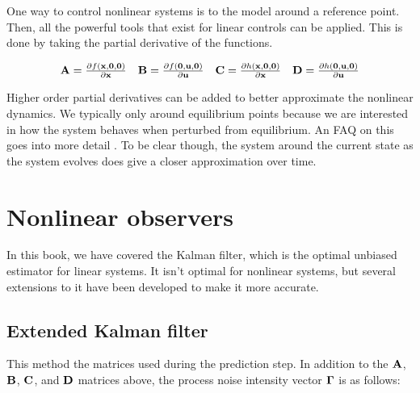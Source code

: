 One way to control nonlinear \glspl{system} is to
 the \gls{model} around a reference point.
Then, all the powerful tools that exist for linear controls can be applied. This
is done by taking the partial derivative of the functions.

\begin{align*}
  \begin{array}{cccc}
    \mathbf{A} = \frac{\partial f(\mathbf{x}, \mathbf{0}, \mathbf{0})}{\partial \mathbf{x}} &
    \mathbf{B} = \frac{\partial f(\mathbf{0}, \mathbf{u}, \mathbf{0})}{\partial \mathbf{u}} &
    \mathbf{C} = \frac{\partial h(\mathbf{x}, \mathbf{0}, \mathbf{0})}{\partial \mathbf{x}} &
    \mathbf{D} = \frac{\partial h(\mathbf{0}, \mathbf{u}, \mathbf{0})}{\partial \mathbf{u}}
  \end{array}
\end{align*}

Higher order partial derivatives can be added to better approximate the
nonlinear dynamics. We typically only  around
equilibrium points because we are interested in how the \gls{system} behaves
when perturbed from equilibrium. An FAQ on this goes into more detail
\cite{bib:linearize_equilibrium_point}. To be clear though,
 the \gls{system} around the current
\gls{state} as the \gls{system} evolves does give a closer approximation over
time.

\section{Nonlinear observers}

In this book, we have covered the Kalman filter, which is the optimal unbiased
estimator for linear \glspl{system}. It isn't optimal for nonlinear
\glspl{system}, but several extensions to it have been developed to make it more
accurate.

\subsection{Extended Kalman filter}

This method  the matrices used during the
prediction step. In addition to the $\mathbf{A}$, $\mathbf{B}$, $\mathbf{C}$, and
$\mathbf{D}$ matrices above, the process noise intensity vector $\mathbf{\Gamma}$ is
 as follows:


